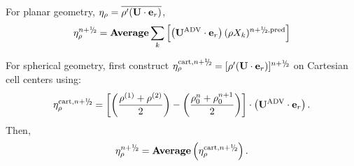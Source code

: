 \documentclass{aastex62}
\newcommand{\sfrac}[2]{\mathchoice
  {\kern0em\raise.5ex\hbox{\the\scriptfont0 #1}\kern-.15em/
   \kern-.15em\lower.25ex\hbox{\the\scriptfont0 #2}}
  {\kern0em\raise.5ex\hbox{\the\scriptfont0 #1}\kern-.15em/
   \kern-.15em\lower.25ex\hbox{\the\scriptfont0 #2}}
  {\kern0em\raise.5ex\hbox{\the\scriptscriptfont0 #1}\kern-.2em/
   \kern-.15em\lower.25ex\hbox{\the\scriptscriptfont0 #2}}
  {#1\!/#2}}
\newcommand{\myhalf}{\sfrac{1}{2}}
\newcommand{\eb}{{\bf{e}}}
\newcommand{\Ub}{{\bf{U}}}
\newcommand{\etarho}{\eta_\rho}
\newcommand{\pred}{{\rm pred}}
\newcommand{\nph}{{n+\myhalf}}
\newcommand{\uadvtwo}{\Ub^{\mathrm{ADV}}}
\begin{document}
\begin{description}
\item For planar geometry, $\etarho = \overline{\rho'(\Ub\cdot\eb_r)}$,
\begin{equation}
 \etarho^{\nph} =  {\rm {\bf Average}} \sum_k \left[ \left(\uadvtwo \cdot \eb_r \right) (\rho X_k)^{\nph,\pred} \right]
\end{equation}
\item For spherical geometry, first construct 
$\etarho^{{\rm cart},\nph} = [\rho'(\Ub\cdot\eb_r)]^{\nph}$ on Cartesian cell centers using:
\begin{equation}
\etarho^{{\rm cart},\nph} = \left[\left(\frac{\rho^{(1)}+\rho^{(2)}}{2}\right)-\left(\frac{\rho_0^n+\rho_0^{n+1}}{2}\right)\right] \cdot \left( \uadvtwo \cdot \eb_r \right).
\end{equation}
Then,
\begin{equation}
\etarho^{\nph} = {\rm {\bf Average}}\left(\etarho^{{\rm cart},\nph}\right).
\end{equation}
\end{description}






\end{document}

